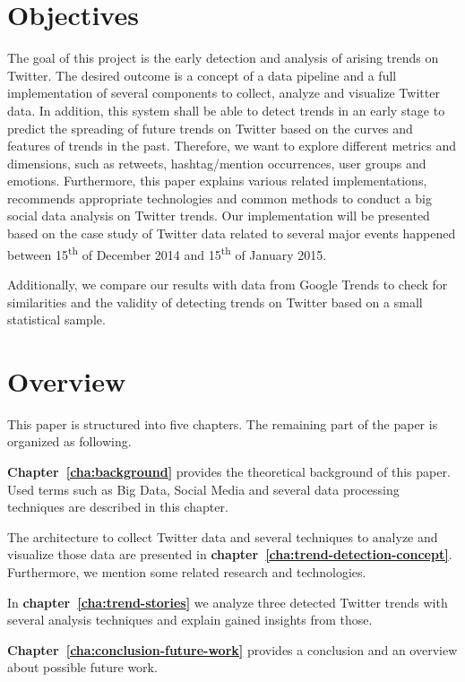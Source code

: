 \section{Objectives}
\label{sec:objectives}
The goal of this project is the early detection and analysis of arising trends on Twitter. The desired outcome is a concept of a data pipeline and a full implementation of several components to collect, analyze and visualize Twitter data. In addition, this system shall be able to detect trends in an early stage to predict the spreading of future trends on Twitter based on the curves and features of trends in the past. Therefore, we want to explore different metrics and dimensions, such as retweets, hashtag/mention occurrences, user groups and emotions. Furthermore, this paper explains various related implementations, recommends appropriate technologies and common methods to conduct a big social data analysis on Twitter trends. Our implementation will be presented based on the case study of Twitter data related to several major events happened between 15\textsuperscript{th} of December 2014 and 15\textsuperscript{th} of January 2015.

Additionally, we compare our results with data from Google Trends to check for similarities and the validity of detecting trends on Twitter based on a small statistical sample.

\clearpage
\section{Overview}
\label{sec:overview}
This paper is structured into five chapters. The remaining part of the paper is organized as following.

\textbf{Chapter~\ref{cha:background}} provides the theoretical background of this paper. Used terms such as Big Data, Social Media and several data processing techniques are described in this chapter.

The architecture to collect Twitter data and several techniques to analyze and visualize those data are presented in \textbf{chapter~\ref{cha:trend-detection-concept}}. Furthermore, we mention some related research and technologies.

In \textbf{chapter~\ref{cha:trend-stories}} we analyze three detected Twitter trends with several analysis techniques and explain gained insights from those.

\textbf{Chapter~\ref{cha:conclusion-future-work}} provides a conclusion and an overview about possible future work.
